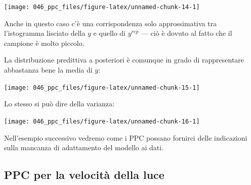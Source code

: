 \documentclass[
  10pt,
  italian,
  a4paper,
  extrafontsizes,onecolumn,openright
  ]{memoir}
\newenvironment{Shaded}{\begin{snugshade}}{\end{snugshade}}
\newcommand{\AttributeTok}[1]{\textcolor[rgb]{0.77,0.63,0.00}{#1}}
\newcommand{\DecValTok}[1]{\textcolor[rgb]{0.00,0.00,0.81}{#1}}
\newcommand{\FunctionTok}[1]{\textcolor[rgb]{0.00,0.00,0.00}{#1}}
\newcommand{\NormalTok}[1]{#1}
\newcommand{\SpecialCharTok}[1]{\textcolor[rgb]{0.00,0.00,0.00}{#1}}
\newcommand{\StringTok}[1]{\textcolor[rgb]{0.31,0.60,0.02}{#1}}
\begin{document}
\begin{Shaded}
\end{Shaded}

\begin{center}\texttt{[image: 046\_ppc\_files/figure-latex/unnamed-chunk-14-1]} \end{center}

Anche in questo caso c'è una corrispondenza solo approssimativa tra l'istogramma lisciato della \(y\) e quello di \(y^{rep}\) --- ciò è dovuto al fatto che il campione è molto piccolo.

La distribuzione predittiva a posteriori è comunque in grado di rappresentare abbastanza bene la media di \(y\):

\begin{Shaded}
\end{Shaded}

\begin{center}\texttt{[image: 046\_ppc\_files/figure-latex/unnamed-chunk-15-1]} \end{center}

\noindent
Lo stesso si può dire della varianza:

\begin{Shaded}
\end{Shaded}

\begin{center}\texttt{[image: 046\_ppc\_files/figure-latex/unnamed-chunk-16-1]} \end{center}

Nell'esempio successivo vedremo come i PPC possano fornirci delle indicazioni sulla mancanza di adattamento del modello ai dati.

\hypertarget{ppc-per-la-velocituxe0-della-luce}{%
\subsection{PPC per la velocità della luce}\label{ppc-per-la-velocituxe0-della-luce}}
\end{document}
